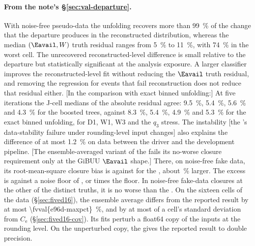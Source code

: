 \paragraph{From the note's \S\ref{sec:val-departure}.}
With noise-free pseudo-data the unfolding recovers more than \SI{99}{\percent} of the change that the departure produces in the reconstructed distribution, whereas the median $(\Eavail,W)$ truth residual ranges from \SI{5}{\percent} to \SI{11}{\percent}, with \SI{74}{\percent} in the worst cell. The unrecovered reconstructed-level difference is small relative to the departure but statistically significant at the analysis exposure.
A larger classifier improves the reconstructed-level fit without reducing the $\Eavail$ truth residual, and removing the regression for events that fail reconstruction does not reduce that residual either.
[In the comparison with exact binned unfolding:] At five iterations the J-cell medians of the absolute residual agree: \SI{9.5}{\percent}, \SI{5.4}{\percent}, \SI{5.6}{\percent} and \SI{4.3}{\percent} for the boosted trees, against \SI{8.3}{\percent}, \SI{5.4}{\percent}, \SI{4.9}{\percent} and \SI{5.3}{\percent} for the exact binned unfolding, for D1, W1, W3 and the $q_3$ stress.
The instability [the \estMultiD{}'s data-stability failure under rounding-level input changes] also explains the difference of at most \SI{1.2}{\percent} on data between the driver and the development pipeline.
[The ensemble-averaged variant of the \estMultiD{} fails its no-worse closure requirement only at the GiBUU $\Eavail$ shape.] There, on noise-free fake data, its root-mean-square closure bias is  against  for the \estMultiD{}, about \,\% larger. The excess is  against a noise floor of , or  times the floor. In noise-free fake-data closures at the other  of the  distinct truths, it is no worse than the \estMultiD{}. On the sixteen cells of the data (\S\ref{sec:fived16}), the ensemble average differs from the reported result by at most \SI{\fvval{e96d-maxpct}}{\percent}, and by at most  of a cell's standard deviation from $C_{\mathrm{e}}$ (\S\ref{sec:fived16-cov}). Its fits perturb a float64 copy of the inputs at the rounding level. On the unperturbed copy, the \estMultiD{} gives the reported result to double precision.

